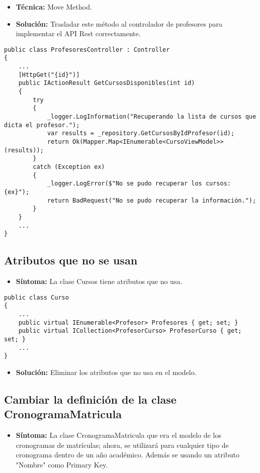 \begin{itemize}
	\item \textbf{Técnica:} Move Method.
	\item \textbf{Solución:} Trasladar este método al controlador de profesores para implementar el API Rest correctamente. 
\end{itemize}

\begin{lstlisting}[language={[Sharp]C}]
public class ProfesoresController : Controller
{
	...
	[HttpGet("{id}")]
	public IActionResult GetCursosDisponibles(int id)
	{
		try
		{
			_logger.LogInformation("Recuperando la lista de cursos que dicta el profesor.");
			var results = _repository.GetCursosByIdProfesor(id);
			return Ok(Mapper.Map<IEnumerable<CursoViewModel>>(results));
		}
		catch (Exception ex)
		{
			_logger.LogError($"No se pudo recuperar los cursos: {ex}");
			return BadRequest("No se pudo recuperar la información.");
		}
	}	
	...
}
\end{lstlisting}





\subsection{Atributos que no se usan}
\begin{itemize}
	\item \textbf{Síntoma:} La clase Cursos tiene atributos que no usa.
\end{itemize}

\begin{lstlisting}[language={[Sharp]C}]
public class Curso
{      
	...
	public virtual IEnumerable<Profesor> Profesores { get; set; }	
	public virtual ICollection<ProfesorCurso> ProfesorCurso { get; set; }
	...
}

\end{lstlisting}

\begin{itemize}
	\item \textbf{Solución:} Eliminar los atributos que no usa en el modelo.
\end{itemize}


\subsection{Cambiar la definición de la clase CronogramaMatricula}
\begin{itemize}
	\item \textbf{Síntoma:} La clase CronogramaMatricula que era el modelo de los cronogramas de matrículas; ahora, se utilizará para cualquier tipo de cronograma dentro de un año académico. Además se usando un atributo "Nombre" como Primary Key.
\end{itemize}

